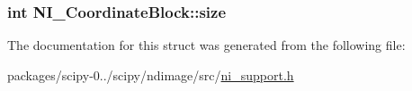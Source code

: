 \subsubsection[{size}]{\setlength{\rightskip}{0pt plus 5cm}int N\+I\+\_\+\+Coordinate\+Block\+::size}\label{structNI__CoordinateBlock_ac630a7634e905ecbc5fa583dc420c176}


The documentation for this struct was generated from the following file\+:\begin{DoxyCompactItemize}
\item 
packages/scipy-\/0../scipy/ndimage/src/\hyperlink{ni__support_8h}{ni\+\_\+support.\+h}\end{DoxyCompactItemize}
